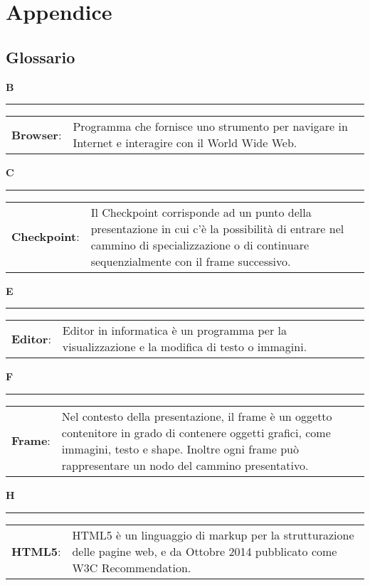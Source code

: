 \newpage
\section{Appendice}

\subsection{Glossario}
\hfill\Huge{\textbf{B}}\\
\rule{16cm}{.6pt}
\normalsize
	\begin{longtable}{p{} p{}} 
	    \\
		    \textbf{Browser}: &	Programma che fornisce uno strumento per navigare in Internet e interagire con il World Wide Web.\\
	\end{longtable}
	
\hfill\Huge{\textbf{C}}\\
\rule{16cm}{.6pt}
\normalsize
	\begin{longtable}{p{} p{}} 
	    \\
		    \textbf{Checkpoint}: &	Il Checkpoint corrisponde ad un punto della presentazione in cui c'è la possibilità di entrare nel cammino di specializzazione o di continuare sequenzialmente con il frame successivo.\\
	\end{longtable}
	
	\hfill\Huge{\textbf{E}}\\
\rule{16cm}{.6pt}
\normalsize
	\begin{longtable}{p{} p{}} 
	    \\
		    \textbf{Editor}: & Editor in informatica è un programma per la visualizzazione e la modifica di testo o immagini.\\
	\end{longtable}
	
	\hfill\Huge{\textbf{F}}\\
\rule{16cm}{.6pt}
\normalsize
	\begin{longtable}{p{} p{}} 
	    \\
		    \textbf{Frame}: & Nel contesto della presentazione, il frame è un oggetto contenitore in grado di contenere oggetti grafici, come immagini, testo e shape. Inoltre ogni frame può rappresentare un nodo del cammino presentativo.
	\end{longtable}
	
	\hfill\Huge{\textbf{H}}\\
\rule{16cm}{.6pt}
\normalsize
	\begin{longtable}{p{} p{}} 
	    \\
		    \textbf{HTML5}: & HTML5 è un linguaggio di markup per la strutturazione delle pagine web, e da Ottobre 2014 pubblicato come W3C Recommendation.
	\end{longtable}
	
